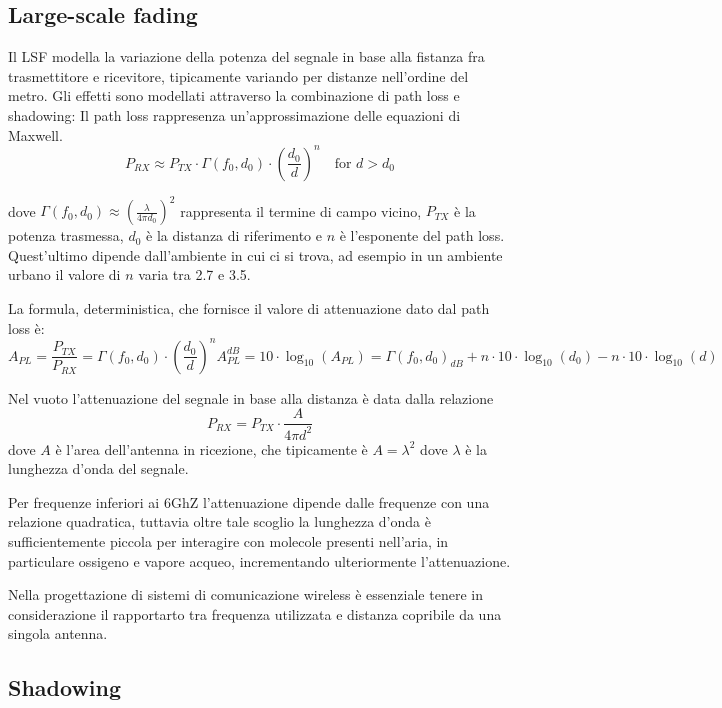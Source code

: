 \subsection*{Large-scale fading}
Il LSF modella la variazione della potenza del segnale in base alla fistanza fra trasmettitore e ricevitore, tipicamente variando per distanze nell'ordine del metro. Gli effetti sono modellati attraverso la combinazione di path loss e shadowing:
Il path loss rappresenza un'approssimazione delle equazioni di Maxwell.
\begin{equation}
    P_{RX} \approx P_{TX} \cdot \Gamma(f_0, d_0) \cdot \left( \frac{d_0}{d} \right)^n \quad \text{for } d > d_0
\end{equation}

dove \( \Gamma(f_0, d_0) \approx \left( \frac{\lambda}{4 \pi d_0} \right)^2 \) rappresenta il termine di campo vicino, \( P_{TX} \) è la potenza trasmessa, \( d_0 \) è la distanza di riferimento e \( n \) è l'esponente del path loss. Quest'ultimo dipende dall'ambiente in cui ci si trova, ad esempio in un ambiente urbano il valore di \( n \) varia tra 2.7 e 3.5.



La formula, deterministica, che fornisce il valore di attenuazione dato dal path loss è:
\[
    A_{PL} = \frac{P_{TX}}{P_{RX}} = \Gamma(f_0, d_0) \cdot \left( \frac{d_0}{d} \right)^n
    A_{PL}^{dB} = 10 \cdot \log_{10}(A_{PL}) = \Gamma(f_0, d_0)_{dB} + n \cdot 10 \cdot \log_{10}(d_0) - n \cdot 10 \cdot \log_{10}(d)
\]


Nel vuoto l'attenuazione del segnale in base alla distanza è data dalla relazione
\[
    P_{RX} = P_{TX} \cdot \frac{A}{4\pi d^2}  
\]
dove \( A \) è l'area dell'antenna in ricezione, che tipicamente è \( A = \lambda^2 \) dove \( \lambda \) è la lunghezza d'onda del segnale.


Per frequenze inferiori ai 6GhZ l'attenuazione dipende dalle frequenze con una relazione quadratica, tuttavia oltre tale scoglio la lunghezza d'onda è sufficientemente piccola per interagire con molecole presenti nell'aria, in particulare ossigeno e vapore acqueo, incrementando ulteriormente l'attenuazione.

Nella progettazione di sistemi di comunicazione wireless è essenziale tenere in considerazione il rapportarto tra frequenza utilizzata e distanza copribile da una singola antenna.

\subsection*{Shadowing}


